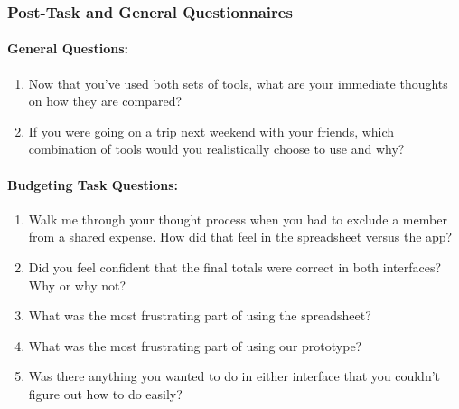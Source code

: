 \documentclass[12pt,a4paper]{article}
\begin{document}
\begin{enumerate}
{\begin{enumerate}
        \end{enumerate}
        
    }

    
\end{enumerate}

\newpage

\subsubsection{Post-Task and General Questionnaires}
\paragraph{General Questions: }
\begin{enumerate}
    \item Now that you’ve used both sets of tools, what are your immediate thoughts on how they are compared? 
    \item If you were going on a trip next weekend with your friends, which combination of tools would you realistically choose to use and why? 
    
\end{enumerate}

\paragraph{Budgeting Task Questions: }
\begin{enumerate}
    \item Walk me through your thought process when you had to exclude a member from a shared expense. How did that feel in the spreadsheet versus the app? 
    \item Did you feel confident that the final totals were correct in both interfaces? Why or why not? 
    \item What was the most frustrating part of using the spreadsheet?
    \item What was the most frustrating part of using our prototype? 
    \item Was there anything you wanted to do in either interface that you couldn’t figure out how to do easily? 
\end{enumerate}
\end{document}
